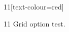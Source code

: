 \documentclass[paper=A4]{ropas-poster}
\begin{document}
\begin{postergrid}{1}{1}[text-colour=red]
\begin{posterblock}{1}{1}
Grid option test.
\end{posterblock}
\end{postergrid}
\end{document}
